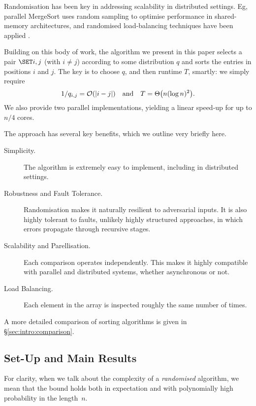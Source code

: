 \documentclass{article}
\begin{document}
Randomisation has been key in addressing scalability in distributed settings.
Eg, parallel MergeSort \cite{C:parallel-mergesort} uses random sampling to optimise performance in shared-memory architectures,
and randomised load-balancing techniques have been applied \cite{AHS:counting-networks}.


Building on this body of work, the algorithm we present in this paper selects a pair $\set{i,j}$ (with $i \ne j$) according to some distribution $q$ and sorts the entries in positions $i$ and $j$.
The key is to choose $q$, and then runtime $T$, smartly:
we simply require
\[
	1/q_{i,j} = \Oh{ \abs{i - j} }
\Quad{and}
	T = \Thb{n (\log n)^2}.
\]
We also provide two parallel implementations, yielding a linear speed-up for up to $n/4$ cores.

The approach has several key benefits, which we outline very briefly here.

\begin{description}%
	\item 
	[Simplicity.]
	The algorithm is extremely easy to implement, including in distributed settings.
	
	\item 
	[Robustness and Fault Tolerance.]
	Randomisation makes it naturally resilient to adversarial inputs.
	It is also highly tolerant to faults, unlikely highly structured approaches, in which errors propagate through recursive stages.
	
	\item 
	[Scalability and Parellisation.]
	Each comparison operates independently.
	This makes it highly compatible with parallel and distributed systems,
	whether asynchronous or not.
	
	\item 
	[Load Balancing.]
	Each element in the array is inspected roughly the same number of times.
\end{description}

\noindent%
A more detailed comparison of sorting algorithms is given in \S\ref{sec:intro:comparison}.


\subsection{Set-Up and Main Results}

For clarity, when we talk about the complexity of a \emph{randomised} algorithm, we mean that the bound holds both in expectation and with polynomially high probability in the length~$n$.
\end{document}

